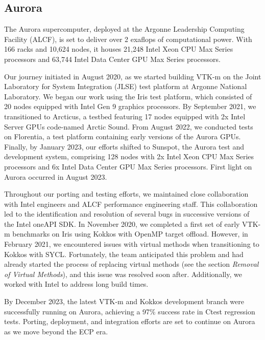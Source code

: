 


\subsection{Aurora}


The Aurora supercomputer, deployed at the Argonne Leadership Computing Facility (ALCF), is set to deliver over 2 exaflops of computational power. With 166 racks and 10,624 nodes, it houses 21,248 Intel Xeon CPU Max Series processors and 63,744 Intel Data Center GPU Max Series processors.

Our journey initiated in August 2020, as we started building VTK-m on the Joint Laboratory for System Integration (JLSE) test platform at Argonne National Laboratory. We began our work using the Iris test platform, which consisted of 20 nodes equipped with Intel Gen 9 graphics processors. By September 2021, we transitioned to Arcticus, a testbed featuring 17 nodes equipped with 2x Intel Server GPUs code-named Arctic Sound. From August 2022, we conducted tests on Florentia, a test platform containing early versions of the Aurora GPUs. Finally, by January 2023, our efforts shifted to Sunspot, the Aurora test and development system, comprising 128 nodes with 2x Intel Xeon CPU Max Series processors and 6x Intel Data Center GPU Max Series processors. First light on Aurora occurred in August 2023.

Throughout our porting and testing efforts, we maintained close collaboration with Intel engineers and ALCF performance engineering staff. This collaboration led to the identification and resolution of several bugs in successive versions of the Intel oneAPI SDK. In November 2020, we completed a first set of early VTK-m benchmarks on Iris using Kokkos with OpenMP target offload. However, in February 2021, we encountered issues with virtual methods when transitioning to Kokkos with SYCL. Fortunately, the team anticipated this problem and had already started the process of replacing virtual methods (see the section {\it Removal of Virtual Methods}), and this issue was resolved soon after. Additionally, we worked with Intel to address long build times.

By December 2023, the latest VTK-m and Kokkos development branch were successfully running on Aurora, achieving a 97\% success rate in Ctest regression tests. Porting, deployment, and integration efforts are set to continue on Aurora as we move beyond the ECP era.